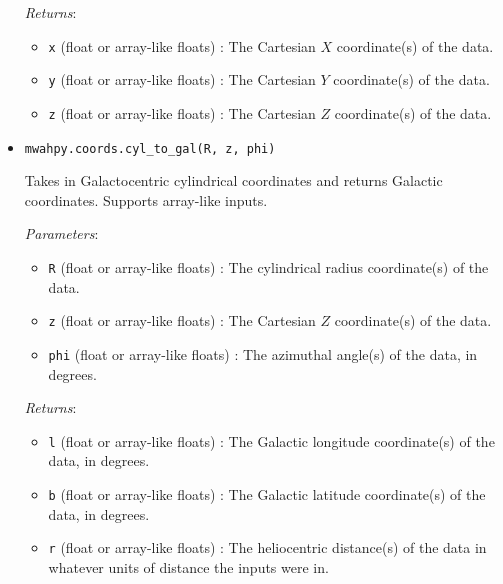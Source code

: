 \documentclass{article}
\begin{document}
\begin{itemize}
\begin{itemize}
\end{itemize}

\textit{Returns}: \begin{itemize}

\item \verb!x! (float or array-like floats) : The Cartesian $X$ coordinate(s) of the data.

\item \verb!y! (float or array-like floats) : The Cartesian $Y$ coordinate(s) of the data.

\item \verb!z! (float or array-like floats) : The Cartesian $Z$ coordinate(s) of the data.

\end{itemize}



\item \verb!mwahpy.coords.cyl_to_gal(R, z, phi)!

Takes in Galactocentric cylindrical coordinates and returns Galactic coordinates. Supports array-like inputs.

\textit{Parameters}: \begin{itemize}

\item \verb!R! (float or array-like floats) : The cylindrical radius coordinate(s) of the data.

\item \verb!z! (float or array-like floats) : The Cartesian $Z$ coordinate(s) of the data.

\item \verb!phi! (float or array-like floats) : The azimuthal angle(s) of the data, in degrees.

\end{itemize}

\textit{Returns}: \begin{itemize}

\item \verb!l! (float or array-like floats) : The Galactic longitude coordinate(s) of the data, in degrees.

\item \verb!b! (float or array-like floats) : The Galactic latitude coordinate(s) of the data, in degrees.

\item \verb!r! (float or array-like floats) : The heliocentric distance(s) of the data in whatever units of distance the inputs were in.

\end{itemize}




\end{itemize}
\end{document}
